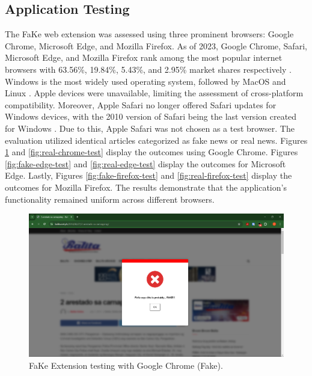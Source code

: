 \subsection{Application Testing}
\label{subsec::app-testing}
The FaKe web extension was assessed using three prominent browsers: Google Chrome, Microsoft Edge, and Mozilla Firefox. As of 2023,
Google Chrome, Safari, Microsoft Edge, and Mozilla Firefox rank among the most popular internet browsers with 63.56\%, 19.84\%,
5.43\%, and 2.95\%  market shares respectively \cite{statista2024}. Windows is the most widely used operating system, followed by
MacOS and Linux \cite{idris2021}. Apple devices were unavailable, limiting the assessment of cross-platform compatibility.
Moreover, Apple Safari no longer offered Safari updates for Windows devices, with the 2010 version of Safari being the last
version created for Windows \cite{apple2024}. Due to this, Apple Safari was not chosen as a test browser. The evaluation utilized identical articles categorized as fake news or real news. Figures \ref{fig:fake-chrome-test} and \ref{fig:real-chrome-test} display the outcomes using Google Chrome. Figures \ref{fig:fake-edge-test} and \ref{fig:real-edge-test} display the outcomes for Microsoft Edge. Lastly, Figures \ref{fig:fake-firefox-test} and \ref{fig:real-firefox-test} display the outcomes for Mozilla Firefox. The results demonstrate that the application's functionality remained uniform across different browsers.

        \begin{figure}[h!]
            \centering
            \includegraphics[width=1\textwidth,height=1\textheight, keepaspectratio]{figures/Screenshots/chrome-true-positive.png}
            \caption{FaKe Extension testing with Google Chrome (Fake).}
            \label{fig:fake-chrome-test}
        \end{figure}

